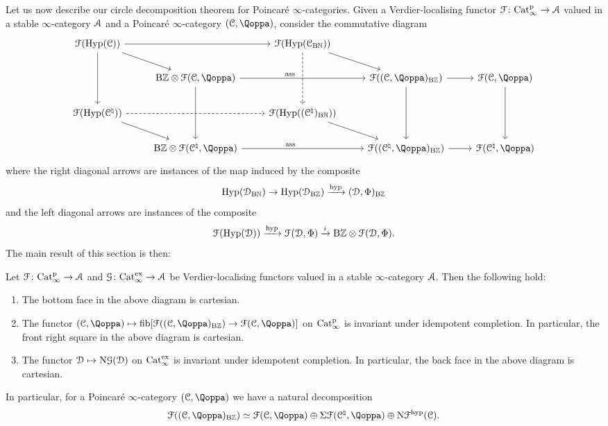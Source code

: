 Let us now describe our circle decomposition theorem for Poincaré $\infty$-categories.
Given a Verdier-localising functor $\mathcal{F}\colon \mathrm{Cat}^{\mathrm p}_\infty \to \mathcal{A}$ valued in a stable $\infty$-category $\mathcal{A}$ and a Poincaré $\infty$-category $(\C,\QF)$, 
consider the commutative diagram
\[
\begin{tikzcd}
\F(\Hyp(\C)) \ar[rr]\ar[dd]\ar[dr] && \F(\Hyp(\C_{\B\NN}))\ar[dd, dashed]\ar[dr] &\\
& \B\ZZ \otimes \F(\C,\QF) \ar[rr, "\ass", pos=0.4]\ar[dd] && \F((\C,\QF)_{\B\ZZ})\ar[dd]\ar[r] & \F(\C,\QF) \ar[dd] \\ 
\F(\Hyp(\C^{\natural})) \ar[rr, dashed]\ar[dr] && \F(\Hyp((\C^{\natural})_{\B\NN}))\ar[dr] &\\
& \B\ZZ \otimes \F(\C^{\natural},\QF) \ar[rr, "\ass",pos=0.4] && \F((\C^{\natural},\QF)_{\B\ZZ}) \ar[r] & \F(\C^{\natural},\QF)
\end{tikzcd}
\]
where the right diagonal arrows are instances of the map induced by the composite %
\[
\operatorname{Hyp}(\mathcal{D}_{\mathrm{B}\mathbb{N}}) \to \operatorname{Hyp}(\mathcal{D}_{\mathrm{B}\mathbb{Z}}) \xrightarrow{\mathrm{hyp}} (\mathcal{D},\Phi)_{\mathrm{B}\mathbb{Z}}
\]
and the left diagonal arrows are instances of the composite 
\[
\mathcal{F}(\operatorname{Hyp}(\mathcal{D})) \xrightarrow{\mathrm{hyp}} \mathcal{F}(\mathcal{D},\Phi) \xrightarrow{i} {\mathrm{B}\mathbb{Z}} \otimes \mathcal{F}(\mathcal{D},\Phi).
\]
The main result of this section is then:


\begin{theorem}
\label{theorem:circle-decomposition}%
Let $\mathcal{F}\colon \mathrm{Cat}^{\mathrm p}_\infty \to \mathcal{A}$ and $\mathcal{G} \colon \mathrm{Cat}_\infty^{\mathrm{ex}} \to \mathcal{A}$ be Verdier-localising functors valued in a stable $\infty$-category $\mathcal{A}$. %
Then the following hold:
\begin{enumerate}
\item
\label{item:main-face}%
The bottom face in the above diagram is cartesian. 
\item
\label{item:relative-circle}%
The functor $(\C,\QF) \mapsto \fib[\F((\C,\QF)_{\B\ZZ}) \to \F(\C,\QF)]$ on $\mathrm{Cat}^{\mathrm p}_\infty$ is invariant under idempotent completion. In particular, 
the front right square in the above diagram is cartesian. 
\item
\label{item:nil}%
The functor $\mathcal{D} \mapsto \mathrm{N}\mathcal{G}(\mathcal{D})$ on $\mathrm{Cat}_\infty^{\mathrm{ex}}$ is invariant under idempotent completion. In particular, the back face in the above diagram is cartesian. 
\end{enumerate}
In particular, for a Poincar\'e $\infty$-category $(\C,\QF)$ we have a natural decomposition
\[
\F((\C,\QF)_{\B\ZZ}) \simeq \F(\C,\QF) \oplus \Sig\F(\C^{\natural},\QF) \oplus \N\F^{\hyp}(\C).
\]
\end{theorem}


